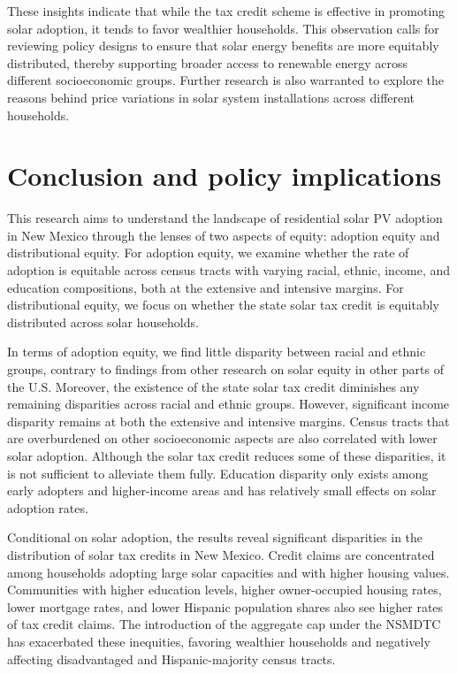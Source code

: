 \documentclass[12pt,twoside,letterpaper]{article}
\begin{document}
These insights indicate that while the tax credit scheme is effective in promoting solar adoption, it tends to favor wealthier households. This observation calls for reviewing policy designs to ensure that solar energy benefits are more equitably distributed, thereby supporting broader access to renewable energy across different socioeconomic groups. Further research is also warranted to explore the reasons behind price variations in solar system installations across different households.


\section[Conclusion]{Conclusion and policy implications}

This research aims to understand the landscape of residential solar PV adoption in New Mexico through the lenses of two aspects of equity: adoption equity and distributional equity. For adoption equity, we examine whether the rate of adoption is equitable across census tracts with varying racial, ethnic, income, and education compositions, both at the extensive and intensive margins. For distributional equity, we focus on whether the state solar tax credit is equitably distributed across solar households.

In terms of adoption equity, we find little disparity between racial and ethnic groups, contrary to findings from other research on solar equity in other parts of the U.S. Moreover, the existence of the state solar tax credit diminishes any remaining disparities across racial and ethnic groups. However, significant income disparity remains at both the extensive and intensive margins. Census tracts that are overburdened on other socioeconomic aspects are also correlated with lower solar adoption. Although the solar tax credit reduces some of these disparities, it is not sufficient to alleviate them fully. Education disparity only exists among early adopters and higher-income areas and has relatively small effects on solar adoption rates.

Conditional on solar adoption, the results reveal significant disparities in the distribution of solar tax credits in New Mexico. Credit claims are concentrated among households adopting large solar capacities and with higher housing values. Communities with higher education levels, higher owner-occupied housing rates, lower mortgage rates, and lower Hispanic population shares also see higher rates of tax credit claims. The introduction of the aggregate cap under the NSMDTC has exacerbated these inequities, favoring wealthier households and negatively affecting disadvantaged and Hispanic-majority census tracts.
\end{document}
